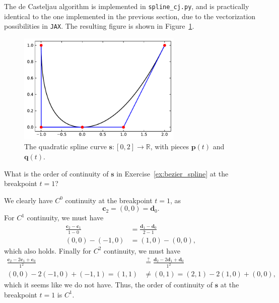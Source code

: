 \begin{solution}
    The de Casteljau algorithm is implemented in \verb|spline_cj.py|, and is practically identical to the one implemented in the previous section, due to the vectorization possibilities in \verb|JAX|.
    The resulting figure is shown in Figure~\ref{fig:bezier_spline}.
    \begin{figure}[ht]
        \centering
        \includegraphics[width=0.7\textwidth]{2_splines_in_bb/bezier_casteljau.pdf}
        \caption{The quadratic spline curve $\mathbf{s} : [0, 2] \to \mathbb{R}$, with pieces $\mathbf{p}(t)$ and $\mathbf{q}(t)$.\label{fig:bezier_spline}}
    \end{figure}
\end{solution}

\begin{exercise}
    What is the order of continuity of $\mathbf{s}$ in Exercise~\ref{ex:bezier_spline} at the breakpoint $t = 1$?
\end{exercise}

\begin{solution}
    We clearly have $C^0$ continuity at the breakpoint $t = 1$, as
    \begin{equation*}
        \mathbf{c}_2 = (0, 0) = \mathbf{d}_0.
    \end{equation*}
    For $C^1$ continuity, we must have
    \begin{align*}
        \frac{\mathbf{c}_2 - \mathbf{c}_1}{1 - 0} &= \frac{\mathbf{d}_1 - \mathbf{d}_0}{2 - 1} \\
        (0, 0) - (-1, 0) &= (1, 0) - (0, 0),
    \end{align*}
    which also holds.
    Finally for $C^2$ continuity, we must have
    \begin{align*}
        \frac{\mathbf{c}_2 - 2 \mathbf{c}_1 + \mathbf{c}_0}{1^2} &\stackrel{?}{=} \frac{\mathbf{d}_2 - 2 \mathbf{d}_1 + \mathbf{d}_0}{1^2} \\
        (0, 0) - 2(-1, 0) + (-1, 1) = (1, 1) &\neq (0, 1) = (2, 1) - 2(1, 0) + (0, 0),
    \end{align*}
    which it seems like we do not have.
    Thus, the order of continuity of $\mathbf{s}$ at the breakpoint $t = 1$ is $C^1$.
\end{solution}
